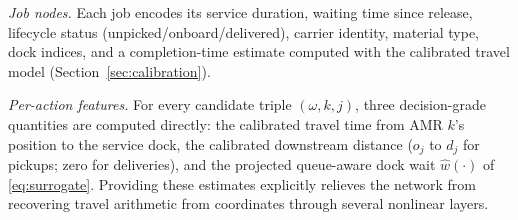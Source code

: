 \emph{Job nodes.} Each job encodes its service duration, waiting time
since release, lifecycle status (unpicked/onboard/delivered), carrier
identity, material type, dock indices, and a completion-time estimate
computed with the calibrated travel model
(Section~\ref{sec:calibration}).

\emph{Per-action features.} For every candidate triple $(\omega,k,j)$,
three decision-grade quantities are computed directly: the calibrated
travel time from AMR $k$'s position to the service dock, the calibrated
downstream distance ($o_j$ to $d_j$ for pickups; zero for deliveries),
and the projected queue-aware dock wait $\hat{w}(\cdot)$ of
\eqref{eq:surrogate}. Providing these estimates explicitly relieves the
network from recovering travel arithmetic from coordinates through
several nonlinear layers.

